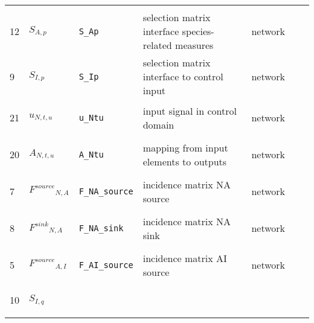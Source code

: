 \begin{longtable}{|p{1cm}|p{2.5cm}|p{4.5cm}|p{8cm}|p{3.0cm}|p{3cm}|p{1cm}|}
             & $  $
             & \\
            12
             & \hypertarget{"v:12"}{ $ {{S}}{_{A, p}} $}
             & \verb|S_Ap|
             & selection matrix interface species-related measures
             & \begin{lay}network \end{lay}
             & $  $
             & \\
            9
             & \hypertarget{"v:9"}{ $ {{S}}{_{I, p}} $}
             & \verb|S_Ip|
             & selection matrix interface to control input
             & \begin{lay}network \end{lay}
             & $  $
             & \\
            21
             & \hypertarget{"v:21"}{ $ {{u}}{_{N, t, u}} $}
             & \verb|u_Ntu|
             & input signal in control domain
             & \begin{lay}network \end{lay}
             & $  $
             & \\
            20
             & \hypertarget{"v:20"}{ $ {{A}}{_{N, t, u}} $}
             & \verb|A_Ntu|
             & mapping from input elements to outputs
             & \begin{lay}network \end{lay}
             & $  $
             & \\
            7
             & \hypertarget{"v:7"}{ $ {{F^{source}}}{_{N, A}} $}
             & \verb|F_NA_source|
             & incidence matrix NA source
             & \begin{lay}network \end{lay}
             & $  $
             & \\
            8
             & \hypertarget{"v:8"}{ $ {{F^{sink}}}{_{N, A}} $}
             & \verb|F_NA_sink|
             & incidence matrix NA sink
             & \begin{lay}network \end{lay}
             & $  $
             & \\
            5
             & \hypertarget{"v:5"}{ $ {{F^{source}}}{_{A, I}} $}
             & \verb|F_AI_source|
             & incidence matrix AI source
             & \begin{lay}network \end{lay}
             & $  $
             & \\
            10
             & \hypertarget{"v:10"}{ $ {{S}}{_{I, q}} $}

\end{longtable}
